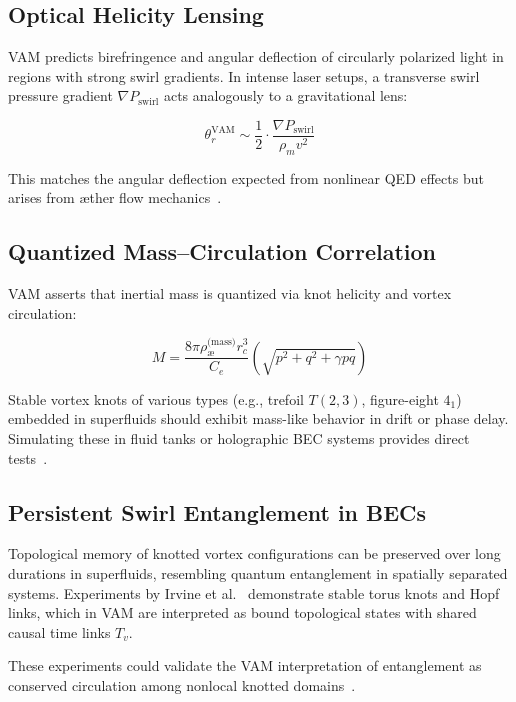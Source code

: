 \documentclass[preprint]{revtex4-2}
\begin{document}
    \subsection{Optical Helicity Lensing}
    VAM predicts birefringence and angular deflection of circularly polarized light in regions with strong swirl gradients. In intense laser setups, a transverse swirl pressure gradient $ \nabla P_{\text{swirl}} $ acts analogously to a gravitational lens:

    \begin{equation}
        \theta_r^{\text{VAM}} \sim \frac{1}{2} \cdot \frac{\nabla P_{\text{swirl}}}{\rho_{\scriptscriptstyle\boldsymbol\!m} v^2}
    \end{equation}

    This matches the angular deflection expected from nonlinear QED effects but arises from æther flow mechanics~\cite{sarazin2016refraction, battesti2013qed, zhang2025simulation}.

    \subsection{Quantized Mass–Circulation Correlation}
    VAM asserts that inertial mass is quantized via knot helicity and vortex circulation:

    \[
        M = \frac{8\pi \rho_{\text{\ae}}^\text{(mass)} r_c^3}{C_e} \left( \sqrt{p^2 + q^2 + \gamma pq} \right)
    \]

    Stable vortex knots of various types (e.g., trefoil \( T(2,3) \), figure-eight \( 4_1 \)) embedded in superfluids should exhibit mass-like behavior in drift or phase delay. Simulating these in fluid tanks or holographic BEC systems provides direct tests~\cite{kleckner2013creation, volovik2003universe}.

    \subsection{Persistent Swirl Entanglement in BECs}
    Topological memory of knotted vortex configurations can be preserved over long durations in superfluids, resembling quantum entanglement in spatially separated systems. Experiments by Irvine et al.~\cite{kleckner2013creation} demonstrate stable torus knots and Hopf links, which in VAM are interpreted as bound topological states with shared causal time links $T_v$.

    These experiments could validate the VAM interpretation of entanglement as conserved circulation among nonlocal knotted domains~\cite{volovik2003universe, kiehn2005torsion}.
\end{document}
